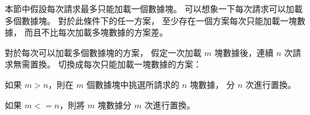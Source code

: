 \startPROBLEM
本節中假設每次請求最多只能加載一個數據塊。
可以想象一下每次請求可以加載多個數據塊。
對於此條件下的任一方案，
至少存在一個方案每次只能加載一塊數據，
而且不比每次加載多塊數據的方案差。
\stopPROBLEM

\startANSWER
對於每次可以加載多個數據塊的方案，
假定一次加載 $m$ 塊數據後，連續 $n$ 次請求無需置換。
切換成每次只能加載一塊數據的方案：

如果 $m>n$，則在 $m$ 個數據塊中挑選所請求的 $n$ 塊數據，
分 $n$ 次進行置換。

如果 $m<=n$，則將 $m$ 塊數據分 $m$ 次進行置換。
\stopANSWER
